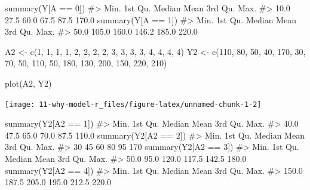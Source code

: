 \documentclass[
  10pt,
  a4paper,
]{book}
\newenvironment{Shaded}{\begin{snugshade}}{\end{snugshade}}
\newcommand{\CommentTok}[1]{\textcolor[rgb]{0.37,0.37,0.37}{#1}}
\newcommand{\DecValTok}[1]{\textcolor[rgb]{0.68,0.00,0.00}{#1}}
\newcommand{\FunctionTok}[1]{\textcolor[rgb]{0.28,0.35,0.67}{#1}}
\newcommand{\NormalTok}[1]{\textcolor[rgb]{0.00,0.46,0.62}{#1}}
\newcommand{\OtherTok}[1]{\textcolor[rgb]{0.00,0.46,0.62}{#1}}
\newcommand{\SpecialCharTok}[1]{\textcolor[rgb]{0.37,0.37,0.37}{#1}}
\begin{document}
\begin{Shaded}
\begin{Highlighting}[]
\FunctionTok{summary}\NormalTok{(Y[A }\SpecialCharTok{==} \DecValTok{0}\NormalTok{])}
\CommentTok{\#\textgreater{}    Min. 1st Qu.  Median    Mean 3rd Qu.    Max. }
\CommentTok{\#\textgreater{}    10.0    27.5    60.0    67.5    87.5   170.0}
\FunctionTok{summary}\NormalTok{(Y[A }\SpecialCharTok{==} \DecValTok{1}\NormalTok{])}
\CommentTok{\#\textgreater{}    Min. 1st Qu.  Median    Mean 3rd Qu.    Max. }
\CommentTok{\#\textgreater{}    50.0   105.0   160.0   146.2   185.0   220.0}

\NormalTok{A2 }\OtherTok{\textless{}{-}} \FunctionTok{c}\NormalTok{(}\DecValTok{1}\NormalTok{, }\DecValTok{1}\NormalTok{, }\DecValTok{1}\NormalTok{, }\DecValTok{1}\NormalTok{, }\DecValTok{2}\NormalTok{, }\DecValTok{2}\NormalTok{, }\DecValTok{2}\NormalTok{, }\DecValTok{2}\NormalTok{, }\DecValTok{3}\NormalTok{, }\DecValTok{3}\NormalTok{, }\DecValTok{3}\NormalTok{, }\DecValTok{3}\NormalTok{, }\DecValTok{4}\NormalTok{, }\DecValTok{4}\NormalTok{, }\DecValTok{4}\NormalTok{, }\DecValTok{4}\NormalTok{)}
\NormalTok{Y2 }\OtherTok{\textless{}{-}} \FunctionTok{c}\NormalTok{(}\DecValTok{110}\NormalTok{, }\DecValTok{80}\NormalTok{, }\DecValTok{50}\NormalTok{, }\DecValTok{40}\NormalTok{, }\DecValTok{170}\NormalTok{, }\DecValTok{30}\NormalTok{, }\DecValTok{70}\NormalTok{, }\DecValTok{50}\NormalTok{, }\DecValTok{110}\NormalTok{, }\DecValTok{50}\NormalTok{, }\DecValTok{180}\NormalTok{,}
        \DecValTok{130}\NormalTok{, }\DecValTok{200}\NormalTok{, }\DecValTok{150}\NormalTok{, }\DecValTok{220}\NormalTok{, }\DecValTok{210}\NormalTok{)}

\FunctionTok{plot}\NormalTok{(A2, Y2)}
\end{Highlighting}
\end{Shaded}

\begin{center}\texttt{[image: 11-why-model-r\_files/figure-latex/unnamed-chunk-1-2]} \end{center}

\begin{Shaded}
\begin{Highlighting}[]
\FunctionTok{summary}\NormalTok{(Y2[A2 }\SpecialCharTok{==} \DecValTok{1}\NormalTok{])}
\CommentTok{\#\textgreater{}    Min. 1st Qu.  Median    Mean 3rd Qu.    Max. }
\CommentTok{\#\textgreater{}    40.0    47.5    65.0    70.0    87.5   110.0}
\FunctionTok{summary}\NormalTok{(Y2[A2 }\SpecialCharTok{==} \DecValTok{2}\NormalTok{])}
\CommentTok{\#\textgreater{}    Min. 1st Qu.  Median    Mean 3rd Qu.    Max. }
\CommentTok{\#\textgreater{}      30      45      60      80      95     170}
\FunctionTok{summary}\NormalTok{(Y2[A2 }\SpecialCharTok{==} \DecValTok{3}\NormalTok{])}
\CommentTok{\#\textgreater{}    Min. 1st Qu.  Median    Mean 3rd Qu.    Max. }
\CommentTok{\#\textgreater{}    50.0    95.0   120.0   117.5   142.5   180.0}
\FunctionTok{summary}\NormalTok{(Y2[A2 }\SpecialCharTok{==} \DecValTok{4}\NormalTok{])}
\CommentTok{\#\textgreater{}    Min. 1st Qu.  Median    Mean 3rd Qu.    Max. }
\CommentTok{\#\textgreater{}   150.0   187.5   205.0   195.0   212.5   220.0}
\end{Highlighting}
\end{Shaded}
\end{document}
